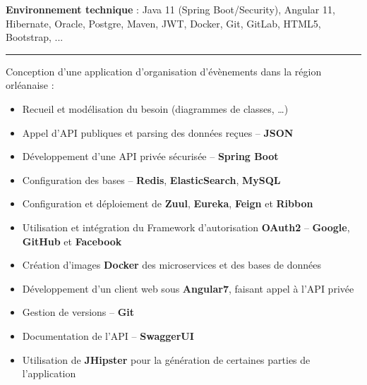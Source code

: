 \documentclass[12pt,a4paper,sans]{moderncv} %
\begin{document}
\vspace{1ex}

\textbf{Environnement technique} : Java 11 (Spring Boot/Security), Angular 11, Hibernate, Oracle, Postgre, Maven, JWT, Docker, Git, GitLab, HTML5, Bootstrap, ...

\vspace{-3mm}

\begin{center}
\textcolor{color1}{\rule{0.6\textwidth}{0.4pt}}
\end{center}

\vspace{1.1mm}


\vspace{1ex}

Conception d'une application d'organisation d'évènements dans la région orléanaise :

{\begin{itemize}
\item Recueil et modélisation du besoin (diagrammes de classes, …)
\item Appel d’API publiques et parsing des données reçues -- \textbf{JSON}
\item Développement d’une API privée sécurisée  -- \textbf{Spring Boot}
\item Configuration des bases  -- \textbf{Redis}, \textbf{ElasticSearch}, \textbf{MySQL}
\item Configuration et déploiement de \textbf{Zuul}, \textbf{Eureka}, \textbf{Feign} et \textbf{Ribbon}
\item Utilisation et intégration du Framework d’autorisation \textbf{OAuth2} -- \textbf{Google}, \textbf{GitHub} et \textbf{Facebook}
\item Création d’images \textbf{Docker} des microservices et des bases de données
\item Développement d’un client web sous \textbf{Angular7}, faisant appel à l’API privée
\item Gestion de versions -- \textbf{Git}
\item Documentation de l’API  -- \textbf{SwaggerUI}
\item Utilisation de \textbf{JHipster} pour la génération de certaines parties de l’application
\end{itemize}}
\end{document}
